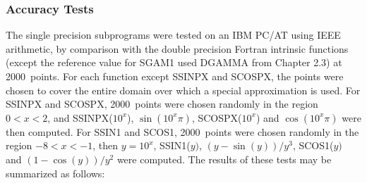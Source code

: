 \documentclass[twoside]{MATH77}
\begin{document}
\subsubsection{Accuracy Tests}

The single precision subprograms were tested on an IBM PC/AT using IEEE
arithmetic, by comparison with the double precision Fortran intrinsic
functions (except the reference value for SGAM1 used DGAMMA from Chapter
2.3) at 2000~points. For each function except SSINPX and SCOSPX, the points
were chosen to cover the entire domain over which a special approximation is
used. For SSINPX and SCOSPX, 2000~points were chosen randomly in the region $%
0<x<2$, and SSINPX($10^x$), $\sin (10^x\pi )$, SCOSPX($10^x$) and $\cos
(10^x\pi )$ were then computed. For SSIN1 and SCOS1, 2000~points were chosen
randomly in the region $-8<x<-1$, then $y=10^x$,
SSIN1($y)$, $(y-\sin (y))/y^3$, SCOS1($y)$ and $(1-\cos (y))/y^2$ were
computed. The results of these tests may be summarized as follows:
\end{document}
